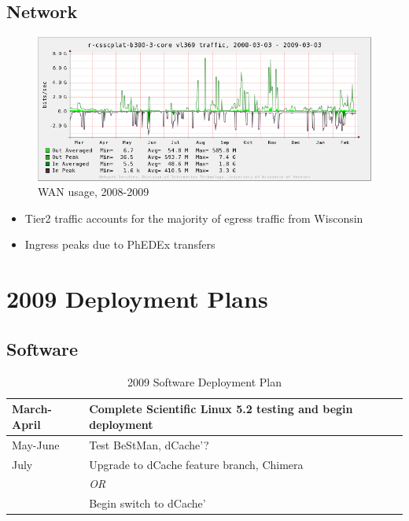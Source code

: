 \documentclass{beamer}
\begin{document}
\subsection{Network}
\begin{frame}
\begin{figure}
    \includegraphics[width=\textwidth]{Graphics/network-1yr.png}
    \caption{WAN usage, 2008-2009}
\end{figure}

\begin{itemize}
    \item Tier2 traffic accounts for the majority of egress traffic from Wisconsin
    \item Ingress peaks due to PhEDEx transfers
\end{itemize}
\end{frame}

\section{2009 Deployment Plans}
\subsection{Software}
\begin{frame}
\begin{table}
\begin{tabular}{lp{}}
    \toprule
    March-April     &   Complete Scientific Linux 5.2 testing and begin deployment \\
    \midrule
    May-June        &   Test BeStMan, dCache'? \\
    \midrule
    July            &   Upgrade to dCache feature branch, Chimera \\
                    &   \hspace{1cm}\emph{OR} \\
                    &   Begin switch to dCache' \\
    \bottomrule
\end{tabular}
\caption{2009 Software Deployment Plan}
\label{2009_software_deployment_plan}
\end{table}

\end{frame}
\end{document}
